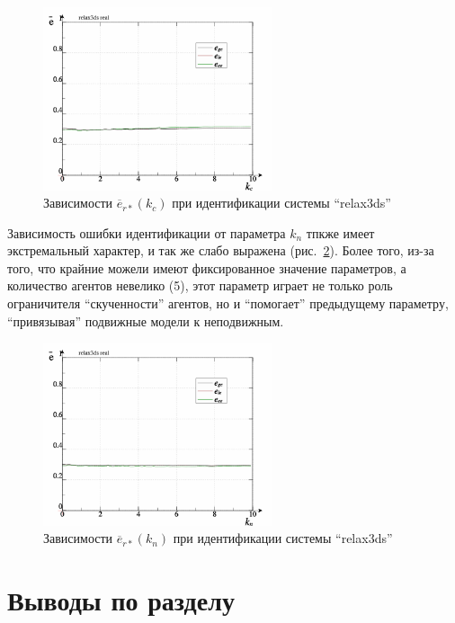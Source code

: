 \begin{figure}[htb!]
  \centerline{\includegraphics[width=0.6\textwidth]{p/relax3ds_read_id2_prm_0-p_k_cl.png} }
  \caption{Зависимости $\overline{e}_{r*}(k_c)$ при идентификации системы ``relax3ds''}
  \label{atu:f:relax3ds_read_id2_prm_0-p_k_c}
\end{figure}

Зависимость ошибки идентификации от параметра $k_n$
тпкже имеет экстремальный характер,
и так же слабо выражена
(рис.~\ref{atu:f:relax3ds_read_id2_prm_0-p_k_n}).
Более того, из-за того, что крайние можели имеют фиксированное значение параметров,
а количество агентов невелико (5), этот параметр играет
не только роль ограничителя ``скученности'' агентов,
но и ``помогает'' предыдущему параметру,
``привязывая'' подвижные модели к неподвижным.


\begin{figure}[htb!]
  \centerline{\includegraphics[width=0.6\textwidth]{p/relax3ds_read_id2_prm_0-p_k_cn.png} }
  \caption{Зависимости $\overline{e}_{r*}(k_n)$ при идентификации системы ``relax3ds''}
  \label{atu:f:relax3ds_read_id2_prm_0-p_k_n}
\end{figure}

\section{Выводы по разделу \thechapter}

